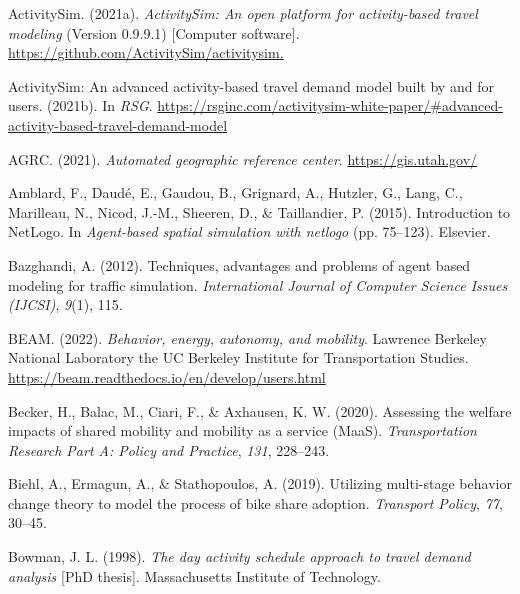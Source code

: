 \documentclass[fancy, masters]{byuthesis}
\newlength{\cslhangindent}
\newlength{\cslentryspacingunit} %
\newenvironment{CSLReferences}[2] %
 {%
  \setlength{\parindent}{0pt}
  \ifodd #1
  \let\oldpar\par
  \def\par{\hangindent=\cslhangindent\oldpar}
  \fi
  \setlength{\parskip}{#2\cslentryspacingunit}
 }%
 {}
\begin{document}
\hypertarget{refs}{}
\begin{CSLReferences}{1}{0}
\leavevmode{}%
ActivitySim. (2021a). \emph{ActivitySim: An open platform for activity-based travel modeling} (Version 0.9.9.1) {[}Computer software{]}. \url{https://github.com/ActivitySim/activitysim.}

\leavevmode{}%
ActivitySim: An advanced activity-based travel demand model built by and for users. (2021b). In \emph{RSG}. \url{https://rsginc.com/activitysim-white-paper/\#advanced-activity-based-travel-demand-model}

\leavevmode{}%
AGRC. (2021). \emph{Automated geographic reference center}. \url{https://gis.utah.gov/}

\leavevmode{}%
Amblard, F., Daudé, E., Gaudou, B., Grignard, A., Hutzler, G., Lang, C., Marilleau, N., Nicod, J.-M., Sheeren, D., \& Taillandier, P. (2015). Introduction to NetLogo. In \emph{Agent-based spatial simulation with netlogo} (pp. 75--123). Elsevier.

\leavevmode{}%
Bazghandi, A. (2012). Techniques, advantages and problems of agent based modeling for traffic simulation. \emph{International Journal of Computer Science Issues (IJCSI)}, \emph{9}(1), 115.

\leavevmode{}%
BEAM. (2022). \emph{Behavior, energy, autonomy, and mobility}. Lawrence Berkeley National Laboratory the UC Berkeley Institute for Transportation Studies. \url{https://beam.readthedocs.io/en/develop/users.html}

\leavevmode{}%
Becker, H., Balac, M., Ciari, F., \& Axhausen, K. W. (2020). Assessing the welfare impacts of shared mobility and mobility as a service (MaaS). \emph{Transportation Research Part A: Policy and Practice}, \emph{131}, 228--243.

\leavevmode{}%
Biehl, A., Ermagun, A., \& Stathopoulos, A. (2019). Utilizing multi-stage behavior change theory to model the process of bike share adoption. \emph{Transport Policy}, \emph{77}, 30--45.

\leavevmode{}%
Bowman, J. L. (1998). \emph{The day activity schedule approach to travel demand analysis} {[}PhD thesis{]}. Massachusetts Institute of Technology.


\end{CSLReferences}
\end{document}
